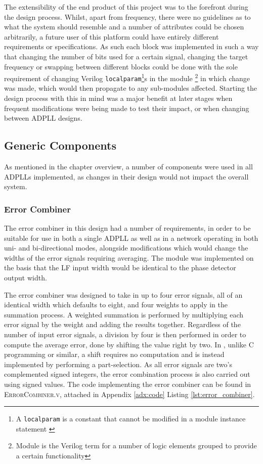 The extensibility of the end product of this project was to the forefront during the design process. Whilst, apart from frequency, there were no guidelines as to what the system should resemble and a number of attributes could be chosen arbitrarily, a future user of this platform could have entirely different requirements or specifications. As such each block was implemented in such a way that changing the number of bits used for a certain signal, changing the target frequency or swapping between different blocks could be done with the sole requirement of changing Verilog \texttt{localparam}\footnote{A \texttt{localparam} is a constant that cannot be modified in a module instance statement \cite{hdlworks}}s in the module \footnote{Module is the Verilog term for a number of logic elements grouped to provide a certain functionality} in which change was made, which would then propagate to any sub-modules affected. Starting the design process with this in mind was a major benefit at later stages when frequent modifications were being made to test their impact, or when changing between \ac{ADPLL} designs.

\subsection{Generic Components}
As mentioned in the chapter overview, a number of components were used in all \acp{ADPLL} implemented, as changes in their design would not impact the overall system.
\subsubsection{Error Combiner}
The error combiner in this design had a number of requirements, in order to be suitable for use in both a single \ac{ADPLL} as well as in a network operating in both uni- and bi-directional modes, alongside modifications which would change the widths of the error signals requiring averaging. The module was implemented on the basis that the \ac{LF} input width would be identical to the phase detector output width.

The error combiner was designed to take in up to four error signals, all of an identical width which defaults to eight, and four weights to apply in the summation process. A weighted summation is performed by multiplying each error signal by the weight and adding the results together. Regardless of the number of input error signals, a division by four is then performed in order to compute the average error, done by shifting the value right by two. In , unlike C programming or similar, a shift requires no computation and is instead implemented by performing a part-selection. As all error signals are two's complemented signed integers, the error combination process is also carried out using signed values. The code implementing the error combiner can be found in \textsc{ErrorCombiner.v}, attached in Appendix \ref{adx:code} Listing \ref{lst:error_combiner}.

